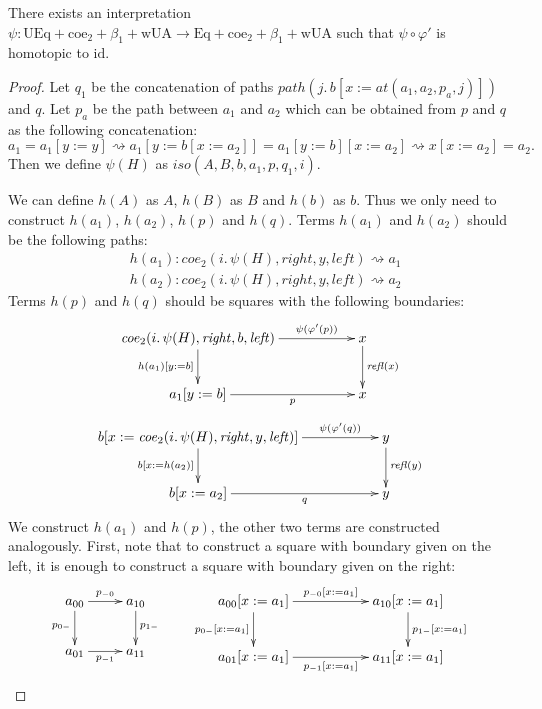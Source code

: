\documentclass{mscs}
\newcommand{\repl}{:=}
\newcommand{\wUA}{\mathrm{wUA}}
\newcommand{\coeT}{\mathrm{coe}}
\newcommand{\Eq}{\mathrm{Eq}}
\newcommand{\UEq}{\mathrm{UEq}}
\newcommand{\id}{\mathrm{id}}
\newcommand{\refl}{\mathit{refl}}
\newcommand{\leftI}{\mathit{left}}
\newcommand{\rightI}{\mathit{right}}
\newcommand{\coe}{\mathit{coe}}
\newcommand{\idtype}{\rightsquigarrow}
\newcommand{\pathI}{\mathit{path}}
\newcommand{\at}{\mathit{at}}
\newcommand{\iso}{\mathit{iso}}
\numberwithin{figure}{section}
\begin{document}
\begin{lem}[UA]
There exists an interpretation $\psi : \UEq + \coeT_2 + \beta_1 + \wUA \to \Eq + \coeT_2 + \beta_1 + \wUA$ such that $\psi \circ \varphi'$ is homotopic to $\id$.
\end{lem}
\begin{proof}
Let $q_1$ be the concatenation of paths $\pathI(j.\,b[x \repl \at(a_1, a_2, p_a,j)])$ and $q$.
Let $p_a$ be the path between $a_1$ and $a_2$ which can be obtained from $p$ and $q$ as the following concatenation:
\[ a_1 = a_1[y \repl y] \idtype a_1[y \repl b[x \repl a_2]] = a_1[y \repl b][x \repl a_2] \idtype x[x \repl a_2] = a_2. \]
Then we define $\psi(H)$ as $\iso(A, B, b, a_1, p, q_1, i)$.

We can define $h(A)$ as $A$, $h(B)$ as $B$ and $h(b)$ as $b$.
Thus we only need to construct $h(a_1)$, $h(a_2)$, $h(p)$ and $h(q)$.
Terms $h(a_1)$ and $h(a_2)$ should be the following paths:
\begin{align*}
& h(a_1) : \coe_2(i.\,\psi(H), \rightI, y, \leftI) \idtype a_1 \\
& h(a_2) : \coe_2(i.\,\psi(H), \rightI, y, \leftI) \idtype a_2
\end{align*}
Terms $h(p)$ and $h(q)$ should be squares with the following boundaries:
\[ \xymatrix{ \coe_2(i.\,\psi(H), \rightI, b, \leftI) \ar[rr]^-{\psi(\varphi'(p))} \ar[d]_{h(a_1)[y \repl b]} & & x \ar[d]^{\refl(x)} \\
              a_1[y \repl b] \ar[rr]_-p                                                                       & & x
            } \]
\[ \xymatrix{ b[x \repl \coe_2(i.\,\psi(H), \rightI, y, \leftI)] \ar[rr]^-{\psi(\varphi'(q))} \ar[d]_{b[x \repl h(a_2)]} & & y \ar[d]^{\refl(y)} \\
              b[x \repl a_2] \ar[rr]_-q                                                                                  & & y
            } \]
We construct $h(a_1)$ and $h(p)$, the other two terms are constructed analogously.
First, note that to construct a square with boundary given on the left, it is enough to construct a square with boundary given on the right:
\[ \xymatrix{ a_{00} \ar[r]^{p_{-0}} \ar[d]_{p_{0-}} & a_{10} \ar[d]^{p_{1-}} \\
              a_{01} \ar[r]_{p_{-1}}                 & a_{11}
            }
\qquad
   \xymatrix{ a_{00}[x \repl a_1] \ar[rr]^{p_{-0}[x \repl a_1]} \ar[d]_{p_{0-}[x \repl a_1]} & & a_{10}[x \repl a_1] \ar[d]^{p_{1-}[x \repl a_1]} \\
              a_{01}[x \repl a_1] \ar[rr]_{p_{-1}[x \repl a_1]}                              & & a_{11}[x \repl a_1]
}\]
\end{proof}
\end{document}
